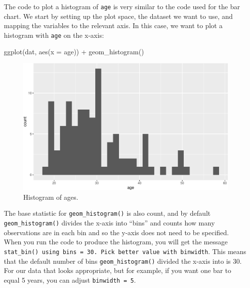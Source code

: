 \documentclass[
  english,
  doc,floatsintext]{apa6}
\newenvironment{Shaded}{\begin{snugshade}}{\end{snugshade}}
\newcommand{\AttributeTok}[1]{\textcolor[rgb]{0.77,0.63,0.00}{#1}}
\newcommand{\FunctionTok}[1]{\textcolor[rgb]{0.00,0.00,0.00}{#1}}
\newcommand{\NormalTok}[1]{#1}
\newcommand{\SpecialCharTok}[1]{\textcolor[rgb]{0.00,0.00,0.00}{#1}}
\begin{document}
The code to plot a histogram of \texttt{age} is very similar to the code used for the bar chart. We start by setting up the plot space, the dataset we want to use, and mapping the variables to the relevant axis. In this case, we want to plot a histogram with \texttt{age} on the x-axis:

\begin{Shaded}
\begin{Highlighting}[]
\FunctionTok{ggplot}\NormalTok{(dat, }\FunctionTok{aes}\NormalTok{(}\AttributeTok{x =}\NormalTok{ age)) }\SpecialCharTok{+}
  \FunctionTok{geom\_histogram}\NormalTok{()}
\end{Highlighting}
\end{Shaded}

\begin{figure}

{\centering \includegraphics[width=1\linewidth]{images/histogram1-1} 

}

\caption{Histogram of ages.}\label{fig:histogram1}
\end{figure}

The base statistic for \texttt{geom\_histogram()} is also count, and by default \texttt{geom\_histogram()} divides the x-axis into ``bins'' and counts how many observations are in each bin and so the y-axis does not need to be specified. When you run the code to produce the histogram, you will get the message \texttt{stat\_bin()\ using\ bins\ =\ 30.\ Pick\ better\ value\ with\ binwidth}. This means that the default number of bins \texttt{geom\_histogram()} divided the x-axis into is 30. For our data that looks appropriate, but for example, if you want one bar to equal 5 years, you can adjust \texttt{binwidth\ =\ 5}.
\end{document}
